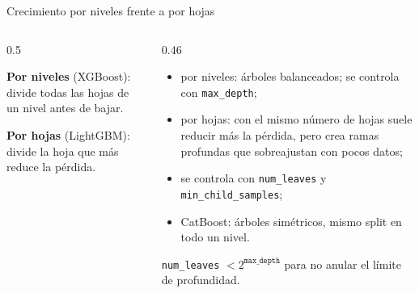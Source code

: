 \documentclass[aspectratio=169,12pt]{beamer}
\begin{document}
\begin{frame}{Crecimiento por niveles frente a por hojas}
  \begin{columns}[T]
    \begin{column}{0.5\textwidth}
      \centering
      \par\footnotesize\textbf{Por niveles} (XGBoost): divide todas las hojas de un nivel antes de bajar.
      \par\vspace{6pt}
      \par\footnotesize\textbf{Por hojas} (LightGBM): divide la hoja que más reduce la pérdida.
    \end{column}
    \begin{column}{0.46\textwidth}
      \footnotesize
      \begin{itemize}
        \item por niveles: árboles balanceados; se controla con \texttt{max\_depth};
        \item por hojas: con el mismo número de hojas suele reducir más la pérdida, pero crea ramas profundas que sobreajustan con pocos datos;
        \item se controla con \texttt{num\_leaves} y \texttt{min\_child\_samples};
        \item CatBoost: árboles simétricos, mismo split en todo un nivel.
      \end{itemize}
      \begin{rulebox}[Regla]
        \footnotesize \texttt{num\_leaves} $< 2^{\texttt{max\_depth}}$ para no anular el límite de profundidad.
      \end{rulebox}
    \end{column}
  \end{columns}
\end{frame}
\end{document}
